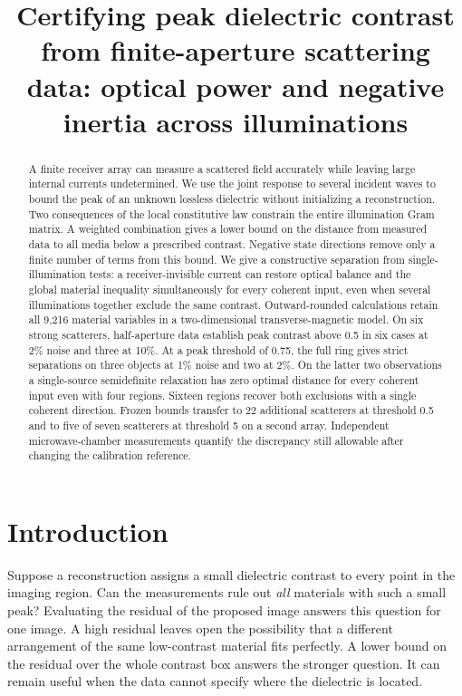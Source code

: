\documentclass[anonymous,12pt]{iopjournal}
\theoremstyle{remark}\newtheorem{remark}[theorem]{Remark}
\numberwithin{equation}{section}
\begin{document}
\par\vspace{1.8ex}
\title{Certifying peak dielectric contrast from finite-aperture scattering data: optical power and negative inertia across illuminations}
\author{}
\begin{abstract}
A finite receiver array can measure a scattered field accurately while leaving large internal currents undetermined. We use the joint response to several incident waves to bound the peak of an unknown lossless dielectric without initializing a reconstruction. Two consequences of the local constitutive law constrain the entire illumination Gram matrix. A weighted combination gives a lower bound on the distance from measured data to all media below a prescribed contrast. Negative state directions remove only a finite number of terms from this bound. We give a constructive separation from single-illumination tests: a receiver-invisible current can restore optical balance and the global material inequality simultaneously for every coherent input, even when several illuminations together exclude the same contrast. Outward-rounded calculations retain all 9,216 material variables in a two-dimensional transverse-magnetic model. On six strong scatterers, half-aperture data establish peak contrast above 0.5 in six cases at 2\% noise and three at 10\%. At a peak threshold of 0.75, the full ring gives strict separations on three objects at 1\% noise and two at 2\%. On the latter two observations a single-source semidefinite relaxation has zero optimal distance for every coherent input even with four regions. Sixteen regions recover both exclusions with a single coherent direction. Frozen bounds transfer to 22 additional scatterers at threshold 0.5 and to five of seven scatterers at threshold 5 on a second array. Independent microwave-chamber measurements quantify the discrepancy still allowable after changing the calibration reference.
\end{abstract}

\section{Introduction}\label{sec:intro}

Suppose a reconstruction assigns a small dielectric contrast to every point in the imaging region. Can the measurements rule out \emph{all} materials with such a small peak? Evaluating the residual of the proposed image answers this question for one image. A high residual leaves open the possibility that a different arrangement of the same low-contrast material fits perfectly. A lower bound on the residual over the whole contrast box answers the stronger question. It can remain useful when the data cannot specify where the dielectric is located.
\end{document}
